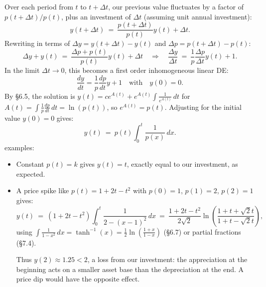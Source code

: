 \documentclass[11pt]{article}
\begin{document}
Over each period from $t$ to $t{+}\Delta t$, 
our previous value fluctuates by a factor of $p(t{+}\Delta t)/p(t)$,
plus an investment of $\Delta t$ (assuming unit annual investment):
$$
y(t{+}\Delta t) \ = \ \frac{p(t{+}\Delta t)}{p(t)} y(t) + \Delta t.
$$
Rewriting in terms of $\Delta y = y(t{+}\Delta t)-y(t)$ and $\Delta p = p(t{+}\Delta t)-p(t)$:
$$
\Delta y + y(t) \ = \ \frac{\Delta p + p(t)}{p(t)} y(t) + \Delta t
\quad\Longrightarrow\quad
\frac{\Delta y}{\Delta t} \ = \ \frac{1}{p}\frac{\Delta p}{\Delta t} y(t) + 1.
$$
In the limit $\Delta t\to 0$, this becomes a first order inhomogeneous linear DE:
$$
\frac{dy}{dt} = \frac 1p \frac{dp}{dt} y + 1 \quad
\text{with} \quad y(0)=0.
$$
By \S6.5, the solution is $y(t) = ce^{A(t)}+e^{A(t)}\!\int \frac{1}{e^{A(t)}}\,dt$
for $A(t) = \int \frac 1p \frac{dp}{dt}\,dt = \ln(p(t))$, so 
$e^{A(t)} = p(t)$. Adjusting for the initial value $y(0)=0$ gives:
$$
y(t) \ = \ p(t)\int_0^t\!  \frac1{p(x)} \,dx.
$$
{\sc examples:}
\begin{itemize}
\item Constant $p(t) = k$ gives $y(t) = t$, exactly equal to our investment,  as expected.

\item A price spike like $p(t) = 1+2t-t^2$ 
with $p(0) = 1$, $p(1)=2$, $p(2)=1$ gives:
$$
y(t) \ =\  
(1{+}2t{-}t^2)\int_0^t\! \frac{1}{2-(x{-}1)^2}\,dx
\ =\ \frac{1{+}2t{-}t^2}{2\sqrt 2}
\ln\!\left(\frac{1+t+\sqrt 2 t}{1+t-\sqrt 2 t}\right),$$
using  $\int\!\! \frac{1}{1-x^2}\,dx = \tanh^{-1}(x) =
\frac12 \ln(\frac{1+x}{1-x})$ (\S6.7)
or partial fractions (\S7.4).

Thus $y(2)\approx 1.25<2$, a loss from our investment: 
the appreciation at the beginning
acts on a smaller asset base than the depreciation at the end.
A price dip would have the opposite effect.
 
%

\end{itemize}
\end{document}
